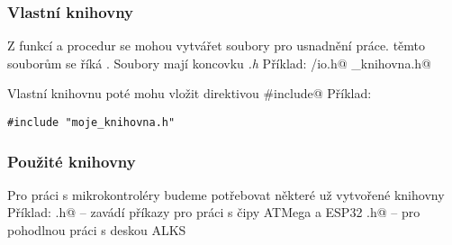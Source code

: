 \subsubsection{Vlastní knihovny}
Z funkcí a procedur se mohou vytvářet soubory pro usnadnění práce. těmto souborům se říká  . 
  Soubory mají koncovku \textit{.h}
Příklad: \verb@avr/io.h@
\verb@moje_knihovna.h@

Vlastní knihovnu poté mohu vložit direktivou \verb@#include@
Příklad:
\begin{verbatim}
#include "moje_knihovna.h"
\end{verbatim} 

\subsubsection{Použité knihovny}  

Pro práci s mikrokontroléry budeme potřebovat některé už vytvořené knihovny
Příklad: 
\verb@Arduino.h@ -- zavádí příkazy pro práci s čipy ATMega a ESP32
\verb@Learningkit.h@  -- pro pohodlnou práci s deskou ALKS

 

